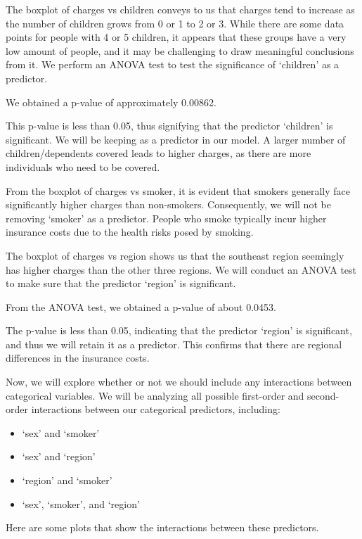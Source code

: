 \documentclass[
  12pt,
]{article}
\providecommand{\tightlist}{%
  \setlength{\itemsep}{0pt}\setlength{\parskip}{0pt}}
\begin{document}
The boxplot of charges vs children conveys to us that charges tend to
increase as the number of children grows from 0 or 1 to 2 or 3. While
there are some data points for people with 4 or 5 children, it appears
that these groups have a very low amount of people, and it may be
challenging to draw meaningful conclusions from it. We perform an ANOVA
test to test the significance of `children' as a predictor.

We obtained a p-value of approximately 0.00862.

This p-value is less than 0.05, thus signifying that the predictor
`children' is significant. We will be keeping as a predictor in our
model. A larger number of children/dependents covered leads to higher
charges, as there are more individuals who need to be covered.

From the boxplot of charges vs smoker, it is evident that smokers
generally face significantly higher charges than non-smokers.
Consequently, we will not be removing `smoker' as a predictor. People
who smoke typically incur higher insurance costs due to the health risks
posed by smoking.

The boxplot of charges vs region shows us that the southeast region
seemingly has higher charges than the other three regions. We will
conduct an ANOVA test to make sure that the predictor `region' is
significant.

From the ANOVA test, we obtained a p-value of about 0.0453.

The p-value is less than 0.05, indicating that the predictor `region' is
significant, and thus we will retain it as a predictor. This confirms
that there are regional differences in the insurance costs.

\newpage

Now, we will explore whether or not we should include any interactions
between categorical variables. We will be analyzing all possible
first-order and second-order interactions between our categorical
predictors, including:

\begin{itemize}
\tightlist
\item
  `sex' and `smoker'
\item
  `sex' and `region'
\item
  `region' and `smoker'
\item
  `sex', `smoker', and `region'
\end{itemize}

Here are some plots that show the interactions between these predictors.
\end{document}
